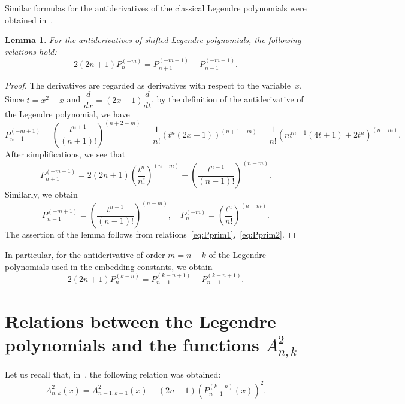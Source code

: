 \documentclass[12pt,oneside]{amsproc}
\numberwithin{equation}{section}
\newtheorem{lem}{Lemma}[section]
\begin{document}
 Similar formulas for the antiderivatives of the classical Legendre polynomials
were obtained in~\cite{HolSh}.

\begin{lem}
 For the antiderivatives of shifted Legendre polynomials,
the following relations hold{\rm:}
\begin{equation}
\label{eq:Prec}
2(2n+1) P_{n}^{(-m)}=P_{n+1}^{(-m+1)}-P_{n-1}^{(-m+1)}.
\end{equation}
\end{lem}
\begin{proof}
 The derivatives are regarded
as derivatives with respect to the variable~$x$.
 Since $t=x^2-x$
and
$\dfrac{d}{dx}=(2x-1)\dfrac{d}{dt}$,
by the definition of the antiderivative of the Legendre polynomial,
we have
$$
P_{n+1}^{(-m+1)}=\left(\dfrac{t^{n+1}}{(n+1)!}\right)^{(n+2-m)}=\dfrac{1}{n!}(t^n(2x-1))^{
(n+1-m)}=
\dfrac{1}{n!}(nt^{n-1}(4t+1)+2t^n)^{(n-m)}.
$$
 After simplifications, we see that
\begin{equation}
\label{eq:Pprim1}
P_{n+1}^{(-m+1)}=2(2n+1)\left(\dfrac{t^n}{n!}\right)^{(n-m)}+
\left(\dfrac{t^{n-1}}{(n-1)!}\right)^{(n-m)}.
\end{equation}
 Similarly, we obtain
\begin{equation}
\label{eq:Pprim2}
P_{n-1}^{(-m+1)}=\left(\dfrac{t^{n-1}}{(n-1)!}\right)^{(n-m)},\quad
P_{n}^{(-m)}=\left(\dfrac{t^{n}}{n!}\right)^{(n-m)}.
\end{equation}
 The assertion of the lemma follows from relations~\eqref{eq:Pprim1},~\eqref{eq:Pprim2}.
\end{proof}

 In particular,
for the antiderivative of order $m=n-k$
of the Legendre polynomials
used in the embedding constants,
we obtain
\begin{equation}
\label{eq:Pprimk}
2(2n+1) P_{n}^{(k-n)}= P_{n+1}^{(k-n+1)}- P_{n-1}^{(k-n+1)}.
\end{equation}

\section{Relations between the Legendre polynomials
and the functions $A^2_{n,k}$}

 Let us recall
that, in~\cite{GarmSh},
the following relation was obtained:
\begin{equation}
\label{eq:PA}
A^2_{n,k}(x)=A^2_{n-1,k-1}(x)-(2n-1)\left(P_{n-1}^{(k-n)}(x)\right)^2.
\end{equation}
\end{document}
